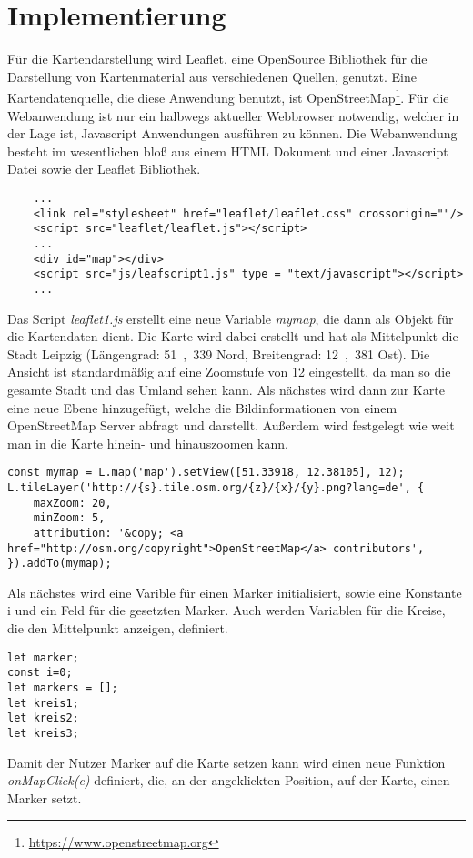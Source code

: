 \documentclass[a4paper, twoside, 12pt]{scrreprt}
\begin{document}
\chapter{Implementierung}
Für die Kartendarstellung wird Leaflet\cite{crickard2014leaflet}, eine OpenSource Bibliothek für die Darstellung von Kartenmaterial aus verschiedenen Quellen, genutzt. Eine Kartendatenquelle, die diese Anwendung benutzt, ist OpenStreetMap\footnote{\url{https://www.openstreetmap.org}}.
Für die Webanwendung ist nur ein halbwegs aktueller Webbrowser notwendig, welcher in der Lage ist, Javascript Anwendungen ausführen zu können.
Die Webanwendung besteht im wesentlichen bloß aus einem HTML Dokument und einer Javascript Datei sowie der Leaflet Bibliothek.
\begin{lstlisting}
	...
	<link rel="stylesheet" href="leaflet/leaflet.css" crossorigin=""/>
	<script src="leaflet/leaflet.js"></script>
	...
	<div id="map"></div>
	<script src="js/leafscript1.js" type = "text/javascript"></script>
	...
\end{lstlisting}
Das Script \textit{leaflet1.js} erstellt eine neue Variable \textit{mymap}, die dann als Objekt für die Kartendaten dient.
Die Karte wird dabei erstellt und hat als Mittelpunkt die Stadt Leipzig (Längengrad: \si{51{,}339}{\textdegree}  Nord, Breitengrad: \si{12{,}381}{\textdegree}  Ost). Die Ansicht ist standardmäßig auf eine Zoomstufe von 12 eingestellt, da man so die gesamte Stadt und das Umland sehen kann.
Als nächstes wird dann zur Karte eine neue Ebene hinzugefügt, welche die Bildinformationen von einem OpenStreetMap Server abfragt und darstellt.
Außerdem wird festgelegt wie weit man in die Karte hinein- und hinauszoomen kann.
\lstset{language=Java}
\begin{lstlisting}
const mymap = L.map('map').setView([51.33918, 12.38105], 12);
L.tileLayer('http://{s}.tile.osm.org/{z}/{x}/{y}.png?lang=de', {
	maxZoom: 20,
	minZoom: 5,
	attribution: '&copy; <a href="http://osm.org/copyright">OpenStreetMap</a> contributors',
}).addTo(mymap);
\end{lstlisting}
Als nächstes wird eine Varible für einen Marker initialisiert, sowie eine Konstante i und ein Feld für die gesetzten Marker. Auch werden Variablen für die Kreise, die den Mittelpunkt anzeigen, definiert.
\begin{lstlisting}
let marker;
const i=0;
let markers = [];
let kreis1;
let kreis2;
let kreis3;
\end{lstlisting}
Damit der Nutzer Marker auf die Karte setzen kann wird einen neue Funktion \textit{onMapClick(e)} definiert, die, an der angeklickten Position, auf der Karte, einen Marker setzt.
\end{document}
